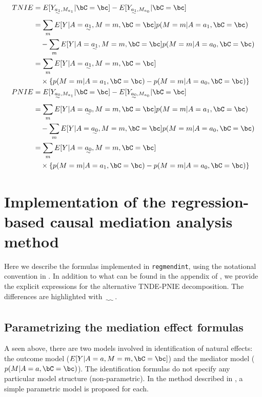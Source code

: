 \documentclass[dvipdfmx,10pt]{article}
\begin{document}
\begin{align*}
  TNIE
  &= E[Y_{\uwave{a_{1}},M_{a_{1}}} | \bC = \bc] - E[Y_{\uwave{a_{1}},M_{a_{0}}} | \bC = \bc]\\
  &=     \sum_{m} E[Y | A = \uwave{a_{1}}, M = m, \bC = \bc] p(M = m | A = a_{1}, \bC = \bc)\\
  &~~~ - \sum_{m} E[Y | A = \uwave{a_{1}}, M = m, \bC = \bc] p(M = m | A = a_{0}, \bC = \bc)\\
  &= \sum_{m} E[Y | A = \uwave{a_{1}}, M = m, \bC = \bc]\\
  &~~~ \times \left\{ p(M = m | A = a_{1}, \bC = \bc) - p(M = m | A = a_{0}, \bC = \bc) \right\}
  \\
  PNIE
   &= E[Y_{\uwave{a_{0}},M_{a_{1}}} | \bC = \bc] - E[Y_{\uwave{a_{0}},M_{a_{0}}} | \bC = \bc]\\
  &=     \sum_{m} E[Y | A = \uwave{a_{0}}, M = m, \bC = \bc] p(M = m | A = a_{1}, \bC = \bc)\\
  &~~~ - \sum_{m} E[Y | A = \uwave{a_{0}}, M = m, \bC = \bc] p(M = m | A = a_{0}, \bC = \bc)\\
  &= \sum_{m} E[Y | A = \uwave{a_{0}}, M = m, \bC = \bc]\\
  &~~~ \times \left\{ p(M = m | A = a_{1}, \bC = \bc) - p(M = m | A = a_{0}, \bC = \bc) \right\}
\end{align*}


\section{Implementation of the regression-based causal mediation analysis method}
\label{sec:org61f0caf}
Here we describe the formulas implemented in \texttt{regmendint}, using the notational convention in \cite{vanderweeleExplanationCausalInference2015,valeriMediationAnalysisAllowing2013,valeriSASMacroCausal2015}. In addition to what can be found in the appendix of \cite{vanderweeleExplanationCausalInference2015}, we provide the explicit expressions for the alternative TNDE-PNIE decomposition. The differences are highlighted with \(\uwave{~~~~}\).

\subsection{Parametrizing the mediation effect formulas}
\label{sec:org8c94792}
A seen above, there are two models involved in identification of natural effects: the outcome model (\(E[Y|A=a,M=m,\bC=\bc]\)) and the mediator model (\(p(M|A=a,\bC=\bc)\)). The identification formulas do not specify any particular model structure (non-parametric). In the method described in \cite{valeriMediationAnalysisAllowing2013,valeriSASMacroCausal2015}, a simple parametric model is proposed for each.\\
\end{document}
